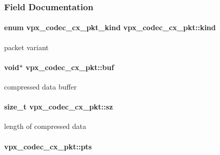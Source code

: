 \subsubsection{\-Field \-Documentation}
\hypertarget{structvpx__codec__cx__pkt_a41f395b39516343c1329a4a85a0084f2}{
\paragraph[{kind}]{\setlength{\rightskip}{0pt plus 5cm}enum {\bf vpx\-\_\-codec\-\_\-cx\-\_\-pkt\-\_\-kind} {\bf vpx\-\_\-codec\-\_\-cx\-\_\-pkt\-::kind}}}
\label{structvpx__codec__cx__pkt_a41f395b39516343c1329a4a85a0084f2}
packet variant \hypertarget{structvpx__codec__cx__pkt_a9e1db068593b6037e70b05b5239784d2}{
\paragraph[{buf}]{\setlength{\rightskip}{0pt plus 5cm}void$\ast$ {\bf vpx\-\_\-codec\-\_\-cx\-\_\-pkt\-::buf}}}
\label{structvpx__codec__cx__pkt_a9e1db068593b6037e70b05b5239784d2}
compressed data buffer \hypertarget{structvpx__codec__cx__pkt_a857321ba2dc65e81c430d14c36a542d9}{
\paragraph[{sz}]{\setlength{\rightskip}{0pt plus 5cm}size\-\_\-t {\bf vpx\-\_\-codec\-\_\-cx\-\_\-pkt\-::sz}}}
\label{structvpx__codec__cx__pkt_a857321ba2dc65e81c430d14c36a542d9}
length of compressed data \hypertarget{structvpx__codec__cx__pkt_aa75fe039fe6b47fb25d20684864bef12}{
\paragraph[{pts}]{ {\bf vpx\-\_\-codec\-\_\-cx\-\_\-pkt\-::pts}}}
\label{structvpx__codec__cx__pkt_aa75fe039fe6b47fb25d20684864bef12}
